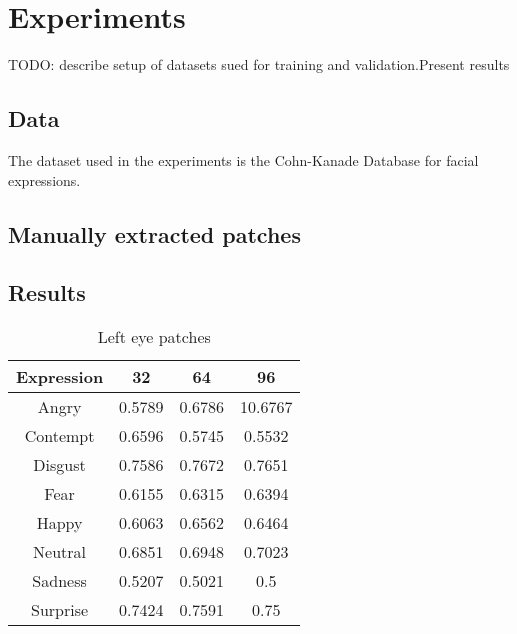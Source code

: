 \section{Experiments}

TODO: describe setup of datasets sued for training and validation.Present results

\subsection{Data}

The dataset used in the experiments is the Cohn-Kanade Database for facial expressions.\nocite{Kanade2000CK+}\nocite{Lucey2010CK+}

\subsection{Manually extracted patches}

\subsection{Results}

\begin{table}
\caption{Left eye patches}
\label{table:left_eye}

\begin{tabular}{| c | c | c | c |}
\hline
Expression & 32 &  64  & 96  \\

\hline
Angry & 0.5789 & 0.6786 & 10.6767 \\
Contempt & 0.6596 &	0.5745 & 0.5532 \\
Disgust	& 0.7586 &	0.7672 &	0.7651 \\
Fear &	0.6155 & 0.6315 & 0.6394 \\ 
Happy &	0.6063 & 0.6562 & 0.6464 \\ 
Neutral & 0.6851 &	0.6948 & 0.7023 \\
Sadness &	0.5207 & 0.5021 &	0.5 \\
Surprise & 0.7424 &	0.7591 & 0.75 \\

\hline
\end{tabular}
\end{table}

